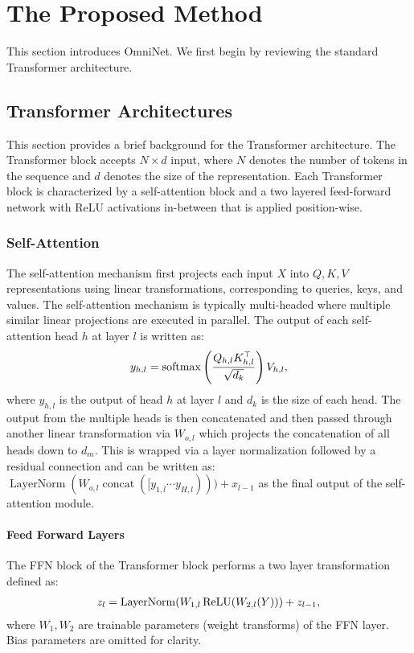 \documentclass{article}
\DeclareMathOperator{\softmax}{softmax}
\DeclareMathOperator{\concat}{concat}
\DeclareMathOperator{\relu}{ReLU}
\DeclareMathOperator{\layernorm}{LayerNorm}
\begin{document}
\section{The Proposed Method}
This section introduces OmniNet. We first begin by reviewing the standard Transformer architecture. 
\subsection{Transformer Architectures}
This section provides a brief background for the Transformer architecture. The Transformer block accepts $N \times d$ input, where $N$ denotes the number of tokens in the sequence and $d$ denotes the size of the representation. Each Transformer block is characterized by a self-attention block and a two layered feed-forward network with ReLU activations in-between that is applied position-wise. 
\subsubsection{Self-Attention}
The self-attention mechanism first projects each input $X$ into $Q,K,V$ representations using linear transformations, corresponding to queries, keys, and values. The self-attention mechanism is typically multi-headed where multiple similar linear projections are executed in parallel. The output of each self-attention head $h$ at layer $l$ is written as:
\begin{align}
\vspace{-5pt}
y_{h,l} = \softmax \left(\frac{Q_{h,l} K_{h,l}^\top}{\sqrt{d_k}}\right) V_{h,l},   
\vspace{-5pt}
\end{align}
where $y_{h,l}$ is the output of head $h$ at layer $l$ and $d_k$ is the size of each head. The output from the multiple heads is then concatenated and then passed through another linear transformation via $W_{o,l}$ which projects the concatenation of all heads down to $d_{m}$. This is wrapped via a layer normalization followed by a residual connection and can be written as: $\layernorm(W_{o,l}\concat([y_{1,l} \cdots y_{H,l}))) + x_{l-1}$ as the final output of the self-attention module. 
\vspace{-5pt}
\paragraph{Feed Forward Layers} The FFN block of the Transformer block performs a two layer transformation defined as:
\begin{align}
\vspace{-5pt}
z_{l}=\layernorm(W_{1,l}\relu(W_{2,l}(Y))) + z_{l-1},
\vspace{-5pt}
\end{align}
where $W_1, W_2$ are trainable parameters (weight transforms) of the FFN layer. Bias parameters are omitted for clarity.
\end{document}
